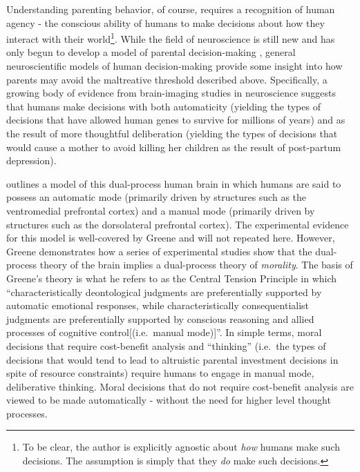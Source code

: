 Understanding parenting behavior, of course, requires a recognition of human
agency - the conscious ability of humans to make decisions about how
they interact with their world\footnote{To be clear, the author is
  explicitly agnostic about \emph{how} humans make such decisions. The
  assumption is simply that they \emph{do} make such decisions.}. While
the field of neuroscience is still new and has only begun to develop a
model of parental decision-making \citep[see for example][]{Ho2014}, general neuroscientific models of human decision-making
provide some insight into how parents may avoid the maltreative
threshold described above. Specifically, a growing body of evidence from
brain-imaging studies in neuroscience suggests that humans make
decisions with both automaticity (yielding the types of decisions that
have allowed human genes to survive for millions of years) and as the
result of more thoughtful deliberation (yielding the types of decisions
that would cause a mother to avoid killing her children as the result of
post-partum depression).

\citet{Greene2014} outlines a model of this dual-process human brain in
which humans are said to possess an automatic mode (primarily driven by
structures such as the ventromedial prefrontal cortex) and a manual mode
(primarily driven by structures such as the dorsolateral prefrontal
cortex). The experimental evidence for this model is well-covered by
Greene and will not repeated here. However, Greene demonstrates how a
series of experimental studies show that the dual-process theory of the
brain implies a dual-process theory of \emph{morality}. The basis of
Greene's theory is what he refers to as the Central Tension Principle in
which ``characteristically deontological judgments are preferentially
supported by automatic emotional responses, while characteristically
consequentialist judgments are preferentially supported by conscious
reasoning and allied processes of cognitive control{[}(i.e.~manual
mode){]}''. In simple terms, moral decisions that require cost-benefit
analysis and ``thinking'' (i.e.~the types of decisions that would tend
to lead to altruistic parental investment decisions in spite of resource
constraints) require humans to engage in manual mode, deliberative
thinking. Moral decisions that do not require cost-benefit analysis are
viewed to be made automatically - without the need for higher level
thought processes.

